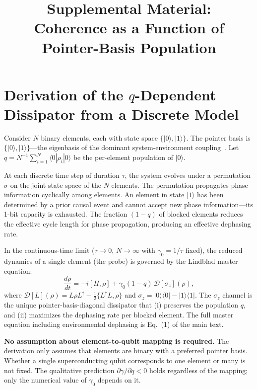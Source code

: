 \documentclass[aps,prl,twocolumn]{revtex4-2}
\begin{document}
\title{Supplemental Material:\\
Coherence as a Function of Pointer-Basis Population}

\maketitle

\section{Derivation of the $q$-Dependent Dissipator from a Discrete Model}

Consider $N$ binary elements, each with state space $\{|0\rangle,|1\rangle\}$. The pointer basis is $\{|0\rangle,|1\rangle\}$---the eigenbasis of the dominant system-environment coupling~\cite{Zurek:2003}. Let $q = N^{-1}\sum_{i=1}^N \langle 0|\rho_i|0\rangle$ be the per-element population of $|0\rangle$.

At each discrete time step of duration $\tau$, the system evolves under a permutation $\sigma$ on the joint state space of the $N$ elements. The permutation propagates phase information cyclically among elements. An element in state $|1\rangle$ has been determined by a prior causal event and cannot accept new phase information---its 1-bit capacity is exhausted. The fraction $(1-q)$ of blocked elements reduces the effective cycle length for phase propagation, producing an effective dephasing rate.

In the continuous-time limit ($\tau \to 0$, $N \to \infty$ with $\gamma_0 = 1/\tau$ fixed), the reduced dynamics of a single element (the probe) is governed by the Lindblad master equation:
\begin{equation}
\frac{d\rho}{dt} = -i[H,\rho] + \gamma_0(1-q)\,\mathcal{D}[\sigma_z](\rho),
\label{eq:sm_lindblad}
\end{equation}
where $\mathcal{D}[L](\rho) = L\rho L^\dagger - \frac{1}{2}\{L^\dagger L,\rho\}$ and $\sigma_z = |0\rangle\langle 0| - |1\rangle\langle 1|$. The $\sigma_z$ channel is the unique pointer-basis-diagonal dissipator that (i) preserves the population $q$, and (ii) maximizes the dephasing rate per blocked element. The full master equation including environmental dephasing is Eq.~(1) of the main text.

\textbf{No assumption about element-to-qubit mapping is required.} The derivation only assumes that elements are binary with a preferred pointer basis. Whether a single superconducting qubit corresponds to one element or many is not fixed. The qualitative prediction $\partial\gamma/\partial q < 0$ holds regardless of the mapping; only the numerical value of $\gamma_0$ depends on it.
\end{document}
